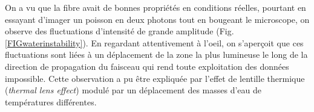 
On a vu que la fibre avait de bonnes propriétés en conditions réelles, pourtant en essayant d'imager un poisson en deux photons tout en bougeant le microscope, on observe des fluctuations d'intensité de grande amplitude (Fig. \ref{FIGwaterinstability}). En regardant attentivement à l'oeil, on s'aperçoit que ces fluctuations sont liées à un déplacement de la zone la plus lumineuse le long de la direction de propagation du faisceau qui rend toute exploitation des données impossible. Cette observation a pu être expliquée par l'effet de lentille thermique (\emph{thermal lens effect}) modulé par un déplacement des masses d'eau de températures différentes.

